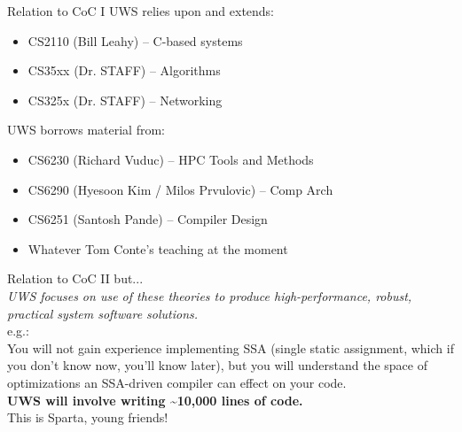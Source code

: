 \documentclass{beamer}
\begin{document}
\begin{frame}{Relation to CoC I}
UWS relies upon and extends:
\begin{itemize}
\item CS2110 (Bill Leahy) -- C-based systems
\item CS35xx (Dr. STAFF) -- Algorithms
\item CS325x (Dr. STAFF) -- Networking
\end{itemize}
UWS borrows material from:
\begin{itemize}
\item CS6230 (Richard Vuduc) -- HPC Tools and Methods
\item CS6290 (Hyesoon Kim / Milos Prvulovic) -- Comp Arch
\item CS6251 (Santosh Pande) -- Compiler Design
\item Whatever Tom Conte's teaching at the moment
\end{itemize}
\end{frame}

\begin{frame}{Relation to CoC II}
but... \\
\emph{UWS focuses on {\it use} of these theories to produce high-performance,
robust, {\it practical} system software solutions.}\linebreak \\
e.g.: \\
You will not gain experience implementing SSA (single static
assignment, which if you don't know now, you'll know later), but you will
understand the space of optimizations an SSA-driven compiler can effect on your
code.\linebreak \\
{\bf UWS will involve writing \~{}10,000 lines of code.}\linebreak \\
This is Sparta, young friends!
\end{frame}
\end{document}
